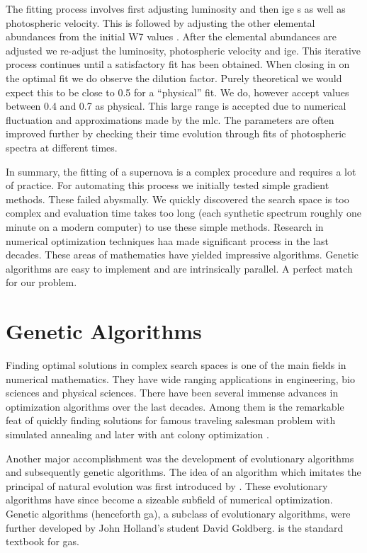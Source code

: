 The fitting process involves first adjusting luminosity and then \gls{ige} s as well as photospheric velocity. This is followed by adjusting the other elemental abundances from the initial W7 values \citep{1984ApJ...286..644N}. After the elemental abundances are adjusted we re-adjust the luminosity, photospheric velocity and \gls{ige}. This iterative process continues until a satisfactory fit has been obtained. When closing in on the optimal fit we do observe the dilution factor. Purely theoretical we would expect this to be close to 0.5 for a ``physical'' fit. We do, however accept values between 0.4 and 0.7 as physical. This large range is accepted due to numerical fluctuation and approximations made by the \gls{mlc}. The parameters are often improved further by checking their time evolution through fits of photospheric spectra at different times.


In summary, the fitting of a supernova is a complex procedure and requires a lot of practice. For automating this process we initially tested simple gradient methods. These failed abysmally. We quickly discovered the search space is too complex and evaluation time takes too long (each synthetic spectrum roughly one minute on a modern computer) to use these simple methods. Research in numerical optimization techniques haa made significant process in the last decades. These areas of mathematics have yielded impressive algorithms. Genetic algorithms are easy to implement and are intrinsically parallel. A perfect match for our problem.

 
\section{Genetic Algorithms}
\label{sec:intro_ga}

Finding optimal solutions in complex search spaces is one of the main fields in numerical mathematics.  They have wide ranging applications in engineering, bio sciences and physical sciences. There have been several immense advances in optimization algorithms over the last decades.
Among them is the  remarkable feat of quickly finding solutions for famous traveling salesman problem with simulated annealing \citep{Kirkpatrick13051983} and later with ant colony optimization \citep{Dorigo97antcolonies}.

Another major accomplishment was the development of evolutionary algorithms and subsequently genetic algorithms. The idea of an algorithm which imitates the principal of natural evolution was first introduced by \cite{Holland:1962:OLT:321127.321128}. These evolutionary algorithms have since become a sizeable subfield of numerical optimization. Genetic algorithms (henceforth \gls{ga}), a subclass of evolutionary algorithms, were further developed by John Holland's student David Goldberg.  \citep{citeulike:125978} is the standard textbook for \glspl{ga}.

